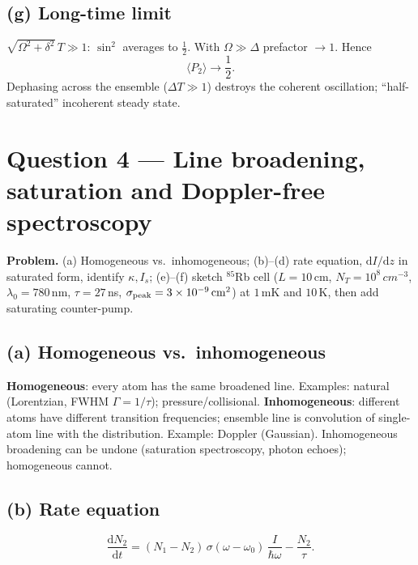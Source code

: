 \documentclass[11pt]{article}
\newcommand{\de}{\mathrm{d}}
\begin{document}
\subsection*{(g) Long-time limit}

$\sqrt{\Omega^2+\delta^2}\,T\gg 1$: $\sin^2$ averages to $\tfrac12$. With $\Omega\gg\Delta$ prefactor $\to 1$. Hence
\begin{equation}
\boxed{\;\langle P_2\rangle \to \frac{1}{2}.\;}
\end{equation}
Dephasing across the ensemble ($\Delta T\gg 1$) destroys the coherent oscillation; ``half-saturated'' incoherent steady state.

\section*{Question 4 --- Line broadening, saturation and Doppler-free spectroscopy}

\textbf{Problem.} (a) Homogeneous vs.\ inhomogeneous; (b)--(d) rate equation, $\de I/\de z$ in saturated form, identify $\kappa,I_s$; (e)--(f) sketch $^{85}$Rb cell ($L=10\,$cm, $N_T=10^8\,\si{cm^{-3}}$, $\lambda_0=780\,$nm, $\tau=27\,$ns, $\sigma_{\rm peak}=3\times 10^{-9}\,\si{cm^2}$) at $1\,$mK and $10\,$K, then add saturating counter-pump.

\subsection*{(a) Homogeneous vs.\ inhomogeneous}

\textbf{Homogeneous}: every atom has the same broadened line. Examples: natural (Lorentzian, FWHM $\Gamma=1/\tau$); pressure/collisional. \textbf{Inhomogeneous}: different atoms have different transition frequencies; ensemble line is convolution of single-atom line with the distribution. Example: Doppler (Gaussian). Inhomogeneous broadening can be undone (saturation spectroscopy, photon echoes); homogeneous cannot.

\subsection*{(b) Rate equation}

\begin{equation}
\frac{\de N_2}{\de t} = (N_1-N_2)\,\sigma(\omega-\omega_0)\,\frac{I}{\hbar\omega} - \frac{N_2}{\tau}.
\label{eq:rateN2}
\end{equation}
\end{document}
